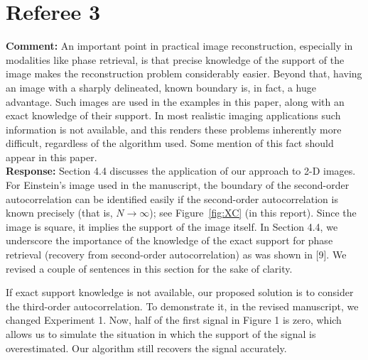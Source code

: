\documentclass[12pt]{article}
\newcommand{\1}{\mathbf{1}}
\newcommand{\TODO}[1]{{\color{red}{[#1]}}}
\theoremstyle{plain}
\theoremstyle{definition}
\theoremstyle{remark}
\theoremstyle{plain}
\theoremstyle{remark}
\theoremstyle{plain}
\theoremstyle{plain}
\theoremstyle{plain}
\numberwithin{equation}{section}
\begin{document}

\section{Referee 3}

\noindent \textbf{Comment:} An important point in practical image reconstruction, especially in modalities like phase retrieval, is that precise knowledge of the support of the image makes the reconstruction problem considerably easier.  Beyond that, having an image with a sharply delineated, known boundary is, in fact, a huge advantage. Such images are used in the examples in this paper, along with an exact knowledge of their support.  In most realistic imaging applications such information is not available, and this renders these problems inherently more difficult, regardless of the algorithm used. Some mention of this fact should appear in this paper.\\

\noindent \textbf{Response:} Section 4.4 discusses the application of our approach to 2-D images. For Einstein's image used in the manuscript, the boundary of the second-order autocorrelation  can be identified easily if the second-order autocorrelation is known precisely (that is, $N\to\infty$); see Figure~\ref{fig:XC} (in this report). 
Since the image is square, it implies the support of the image itself. 
In Section 4.4, we underscore the importance of the knowledge of the exact support for phase retrieval (recovery from second-order autocorrelation) as was shown in [9]. 
We revised a couple of sentences in this section for the sake of clarity. 

If exact support knowledge is not available, our proposed solution is to consider the third-order autocorrelation.
To demonstrate it, in the revised manuscript, we changed Experiment 1. Now, half of the first signal in Figure 1 is zero, which allows us to simulate the situation in which the support of the signal is overestimated. Our algorithm still recovers the signal accurately. \\
\end{document}
